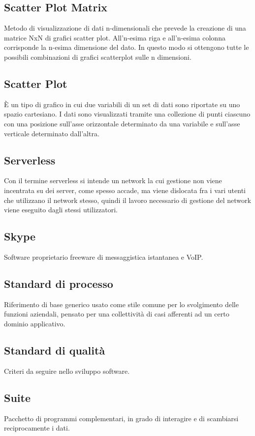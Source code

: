 \documentclass[../glossario.tex]{subfiles}
\begin{document}
\subsection*{Scatter Plot Matrix}
{} 
Metodo di visualizzazione di dati n-dimensionali che prevede la creazione di una matrice NxN di grafici scatter plot. All’n-esima riga e all’n-esima colonna corrisponde la n-esima dimensione del dato. In questo modo si ottengono tutte le possibili combinazioni di grafici scatterplot sulle n dimensioni.

\subsection*{Scatter Plot} 
È un tipo di grafico in cui due variabili di un set di dati sono riportate su uno spazio cartesiano. I dati sono visualizzati tramite una collezione di punti ciascuno con una posizione sull'asse orizzontale determinato da una variabile e sull'asse verticale determinato dall'altra.


\subsection*{Serverless} 
Con il termine serverless si intende un network la cui gestione non viene incentrata su dei server, come spesso accade, ma viene dislocata fra i vari utenti che utilizzano il network stesso, quindi il lavoro necessario di gestione del network viene eseguito dagli stessi utilizzatori.

\subsection*{Skype} 
Software proprietario freeware di messaggistica istantanea e VoIP.

\subsection*{Standard di processo} 
Riferimento di base generico usato come stile comune per lo svolgimento delle funzioni aziendali, pensato per una collettività di casi afferenti ad un certo dominio applicativo.

\subsection*{Standard di qualità} 
Criteri da seguire nello sviluppo software.


\subsection*{Suite} 
Pacchetto di programmi complementari, in grado di interagire e di scambiarsi reciprocamente i dati.

    
\end{document}
